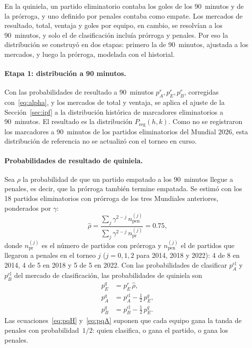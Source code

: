 \documentclass[12pt]{article}
\theoremstyle{plain}
\theoremstyle{remark}
\begin{document}
En la quiniela, un partido eliminatorio contaba los goles de los
90~minutos y de la prórroga, y uno definido por penales contaba como
empate.
Los mercados de resultado, total, ventaja y goles por equipo, en
cambio, se resolvían a los 90~minutos, y solo el de clasificación
incluía prórroga y penales.
Por eso la distribución se construyó en dos etapas: primero la de
90~minutos, ajustada a los mercados, y luego la prórroga, modelada
con el historial.

\paragraph{Etapa 1: distribución a 90 minutos.}
Con las probabilidades de resultado a 90~minutos $p^r_A, p^r_E,
p^r_B$, corregidas con~\eqref{eq:alpha}, y los mercados de total y
ventaja, se aplica el ajuste de la Sección~\ref{sec:ipf} a la
distribución histórica de marcadores eliminatorios a 90~minutos.
El resultado es la distribución $P_{\mathrm{reg}}(h, k)$.
Como no se registraron los marcadores a 90~minutos de los partidos
eliminatorios del Mundial 2026, esta distribución de referencia no se
actualizó con el torneo en curso.

\paragraph{Probabilidades de resultado de quiniela.}
Sea $\rho$ la probabilidad de que un partido empatado a
los 90~minutos llegue a penales, es decir, que la prórroga también
termine empatada.
Se estimó con los 18 partidos eliminatorios con prórroga de los tres
Mundiales anteriores, ponderados por $\gamma$:
\begin{equation}
  \hat\rho
  = \frac{\sum_j \gamma^{2-j}\,n^{(j)}_{\mathrm{pen}}}
         {\sum_j \gamma^{2-j}\,n^{(j)}_{\mathrm{pr}}}
  = 0.75,
\end{equation}
donde $n^{(j)}_{\mathrm{pr}}$ es el número de partidos con prórroga y
$n^{(j)}_{\mathrm{pen}}$ el de partidos que llegaron a penales en el
torneo $j$ ($j = 0, 1, 2$ para 2014, 2018 y 2022): 4 de 8 en 2014, 4
de 5 en 2018 y 5 de 5 en 2022.
Con las probabilidades de clasificar $p^{\mathrm{cl}}_A$ y
$p^{\mathrm{cl}}_B$ del mercado de clasificación, las probabilidades
de quiniela son
\begin{align}
  p^q_E &= p^r_E \, \hat\rho, \label{eq:pqD} \\
  p^q_A &= p^{\mathrm{cl}}_A - \tfrac{1}{2}\,p^q_E, \label{eq:pqH} \\
  p^q_B &= p^{\mathrm{cl}}_B - \tfrac{1}{2}\,p^q_E. \label{eq:pqA}
\end{align}
Las ecuaciones~\eqref{eq:pqH} y~\eqref{eq:pqA} suponen que cada
equipo gana la tanda de penales con probabilidad~$1/2$: quien
clasifica, o gana el partido, o gana los penales.
\end{document}
